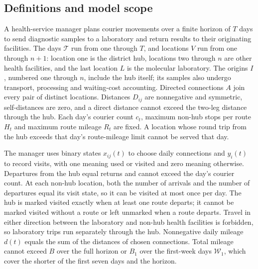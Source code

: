 \documentclass[10pt]{article}
\begin{document}
\subsection*{Definitions and model scope}
A health-service manager plans courier movements over a finite horizon of $T$ days to send diagnostic samples to a laboratory and return results to their originating facilities. The days $\mathcal T$ run from one through $T$, and locations $V$ run from one through $n+1$: location one is the district hub, locations two through $n$ are other health facilities, and the last location $L$ is the molecular laboratory. The origins $I$, numbered one through $n$, include the hub itself; its samples also undergo transport, processing and waiting-cost accounting. Directed connections $A$ join every pair of distinct locations. Distances $D_{ij}$ are nonnegative and symmetric, self-distances are zero, and a direct distance cannot exceed the two-leg distance through the hub. Each day's courier count $c_t$, maximum non-hub stops per route $H_t$ and maximum route mileage $R_t$ are fixed. A location whose round trip from the hub exceeds that day's route-mileage limit cannot be served that day.

The manager uses binary states $x_{ij}(t)$ to choose daily connections and $y_i(t)$ to record visits, with one meaning used or visited and zero meaning otherwise. Departures from the hub equal returns and cannot exceed the day's courier count. At each non-hub location, both the number of arrivals and the number of departures equal its visit state, so it can be visited at most once per day. The hub is marked visited exactly when at least one route departs; it cannot be marked visited without a route or left unmarked when a route departs. Travel in either direction between the laboratory and non-hub health facilities is forbidden, so laboratory trips run separately through the hub. Nonnegative daily mileage $d(t)$ equals the sum of the distances of chosen connections. Total mileage cannot exceed $B$ over the full horizon or $B_1$ over the first-week days $\mathcal W_1$, which cover the shorter of the first seven days and the horizon.
\end{document}
